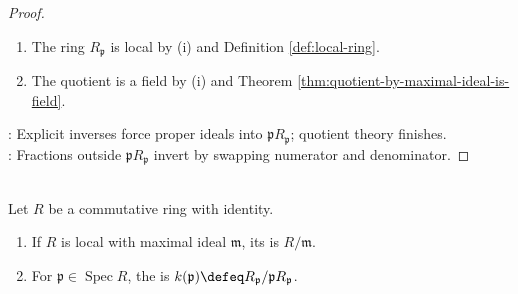 \begin{theorem}
\begin{proof}
\begin{enumerate}[label=(\roman*)]
Therefore $\mathfrak{m}=\mathfrak{p}R_{\mathfrak{p}}$ by maximality of $\mathfrak{m}$ and properness of $\mathfrak{p}R_{\mathfrak{p}}$.
\item The ring $R_{\mathfrak{p}}$ is local by (i) and Definition \ref{def:local-ring}.
\item The quotient is a field by (i) and Theorem \ref{thm:quotient-by-maximal-ideal-is-field}.
\end{enumerate}
: Explicit inverses force proper ideals into $\mathfrak{p}R_{\mathfrak{p}}$; quotient theory finishes.\\
: Fractions outside $\mathfrak{p}R_{\mathfrak{p}}$ invert by swapping numerator and denominator.
\end{proof}
\end{theorem}

\begin{definition} \label{def:residue-fields} \\
Let $R$ be a commutative ring with identity.
\begin{enumerate}[label=(\roman*)]
\setlength{\itemsep}{0pt}
\item If $R$ is local with maximal ideal $\mathfrak{m}$, its  is $R/\mathfrak{m}$.
\item For $\mathfrak{p}\in\operatorname{Spec}R$, the  is $k(\mathfrak{p})\defeq R_{\mathfrak{p}}/\mathfrak{p}R_{\mathfrak{p}}$.
\end{enumerate}
\end{definition}

